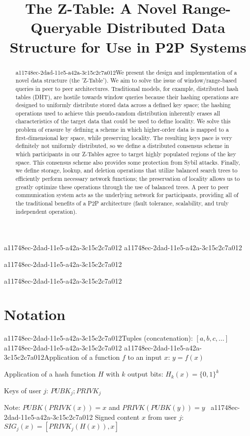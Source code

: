 \documentclass[12pt]{article}
\title{The Z-Table: A Novel Range-Queryable Distributed Data Structure for Use in P2P Systems}
\begin{document}
a11748ec-2dad-11e5-a42a-3c15c2c7a012
a11748ec-2dad-11e5-a42a-3c15c2c7a012\maketitle
a11748ec-2dad-11e5-a42a-3c15c2c7a012
\begin{abstract}
a11748ec-2dad-11e5-a42a-3c15c2c7a012We present the design and implementation of a novel data structure (the 'Z-Table'). We aim to solve the issue of window/range-based queries in peer to peer architectures. Traditional models, for example,  distributed hash tables (DHT), are hostile towards window queries because their hashing operations are designed to uniformly distribute stored data across a defined key space; the hashing operations used to achieve this pseudo-random distribution inherently erases all characteristics of the target data that could be used to define locality. We solve this problem of erasure by defining a scheme in which higher-order data is mapped to a first-dimensional key space, while preserving locality. The resulting keys pace is very definitely not uniformly distributed, so we define a distributed consensus scheme in which participants in our Z-Tables agree to target highly populated regions of the key space. This consensus scheme also provides some protection from Sybil attacks. Finally, we define storage, lookup, and deletion operations that utilize balanced search trees to efficiently perform necessary network functions; the preservation of locality allows us to greatly optimize these operations through the use of balanced trees. A peer to peer communication system acts as the underlying network for participants, providing all of the traditional benefits of a P2P architecture (fault tolerance, scalability, and truly independent operation).
\end{abstract}
a11748ec-2dad-11e5-a42a-3c15c2c7a012
\section{Notation}

a11748ec-2dad-11e5-a42a-3c15c2c7a012Tuples (concatenation): $[a,b,c,...]$
a11748ec-2dad-11e5-a42a-3c15c2c7a012
a11748ec-2dad-11e5-a42a-3c15c2c7a012Application of a function $f$ to an input $x$: $y=f(x)$

Application of a hash function $H$ with $k$ output bits: $H_{k}(x) = \{0,1\}^k$

Keys of user $j$: $ PUBK_j; PRIVK_j $

Note: $PUBK(PRIVK(x)) = x$ and $PRIVK(PUBK(y)) = y$~
a11748ec-2dad-11e5-a42a-3c15c2c7a012
Signed content $x$ from user $j$: $SIG_j(x) = \left[ PRIVK_j( H(x) ), x \right]$
\end{document}
